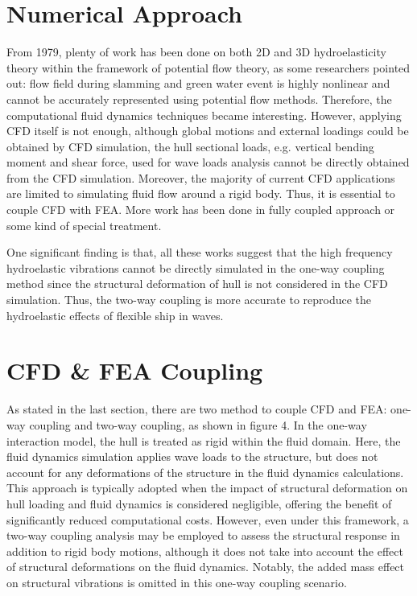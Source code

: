 \documentclass[12pt]{article} %
\begin{document}
\section{Numerical Approach}
From 1979, plenty of work has been done on both 2D and 3D hydroelasticity theory within the framework of potential flow theory\cite{2}\cite{3}, as some researchers pointed out: 
flow field during slamming and green water event is highly nonlinear and cannot be accurately represented using potential flow methods\cite{4}.
Therefore, the computational fluid dynamics techniques became interesting. However, applying CFD itself is not enough, although global motions and external loadings could be obtained by CFD simulation, the hull sectional loads, e.g. 
vertical bending moment and shear force, used for wave loads analysis cannot be directly obtained from the CFD simulation. Moreover, the majority of current 
CFD applications are limited to simulating fluid flow around a rigid body. Thus, it is essential to couple CFD with FEA. More work has been done in fully coupled approach\cite{5} or some kind of special treatment\cite{6}.

One significant finding is that, all these works suggest that the high frequency hydroelastic vibrations cannot be directly simulated in the one-way coupling method since the structural 
deformation of hull is not considered in the CFD simulation. Thus, the two-way coupling is more accurate to reproduce the hydroelastic effects of flexible ship in waves\cite{4}.

\section{CFD \& FEA Coupling}
As stated in the last section, there are two method to couple CFD and FEA: one-way coupling and two-way coupling, as shown in figure 4. 
In the one-way interaction model, the hull is treated as rigid within the fluid domain. Here, the fluid dynamics simulation applies wave loads to the structure, 
but does not account for any deformations of the structure in the fluid dynamics calculations. This approach is typically adopted when the impact of structural 
deformation on hull loading and fluid dynamics is considered negligible, offering the benefit of significantly reduced computational costs. However, even under 
this framework, a two-way coupling analysis may be employed to assess the structural response in addition to rigid body motions, although it does not take into 
account the effect of structural deformations on the fluid dynamics. Notably, the added mass effect on structural vibrations is omitted in this one-way coupling scenario.
\end{document}
